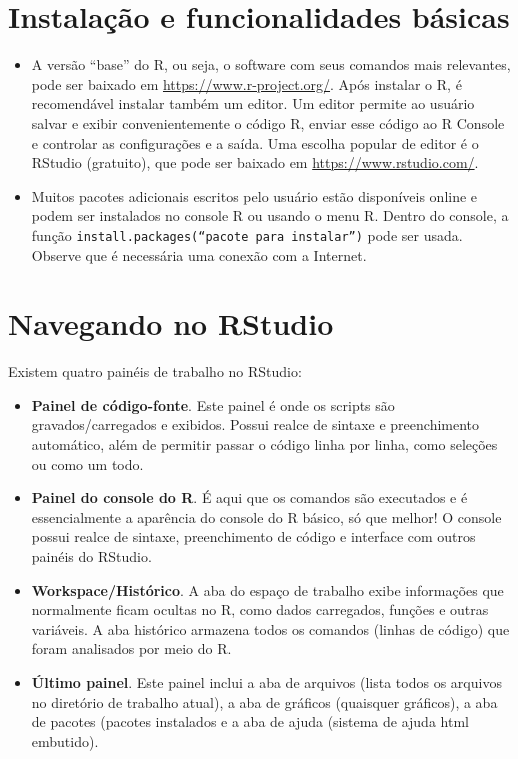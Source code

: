\documentclass[
]{book}
\theoremstyle{definition}
\theoremstyle{definition}
\theoremstyle{definition}
\theoremstyle{definition}
\theoremstyle{remark}
\begin{document}
\section{Instalação e funcionalidades básicas}\label{instalauxe7uxe3o-e-funcionalidades-buxe1sicas}

\begin{itemize}
\item
  A versão ``base'' do R, ou seja, o software com seus comandos mais relevantes, pode ser baixado em \url{https://www.r-project.org/}. Após instalar o R, é recomendável instalar também um editor. Um editor permite ao usuário salvar e exibir convenientemente o código R, enviar esse código ao R Console e controlar as configurações e a saída. Uma escolha popular de editor é o RStudio (gratuito), que pode ser baixado em \url{https://www.rstudio.com/}.
\item
  Muitos pacotes adicionais escritos pelo usuário estão disponíveis online e podem ser instalados no console R ou usando o menu R. Dentro do console, a função \texttt{install.packages(“pacote\ para\ instalar”)} pode ser usada. Observe que é necessária uma conexão com a Internet.
\end{itemize}

\section{Navegando no RStudio}\label{navegando-no-rstudio}

Existem quatro painéis de trabalho no RStudio:

\begin{itemize}
\item
  \textbf{Painel de código-fonte}. Este painel é onde os scripts são gravados/carregados e exibidos. Possui realce de sintaxe e preenchimento automático, além de permitir passar o código linha por linha, como seleções ou como um todo.
\item
  \textbf{Painel do console do R}. É aqui que os comandos são executados e é essencialmente a aparência do console do R básico, só que melhor! O console possui realce de sintaxe, preenchimento de código e interface com outros painéis do RStudio.
\item
  \textbf{Workspace/Histórico}. A aba do espaço de trabalho exibe informações que normalmente ficam ocultas no R, como dados carregados, funções e outras variáveis. A aba histórico armazena todos os comandos (linhas de código) que foram analisados por meio do R.
\item
  \textbf{Último painel}. Este painel inclui a aba de arquivos (lista todos os arquivos no diretório de trabalho atual), a aba de gráficos (quaisquer gráficos), a aba de pacotes (pacotes instalados e a aba de ajuda (sistema de ajuda html embutido).
\end{itemize}
\end{document}
